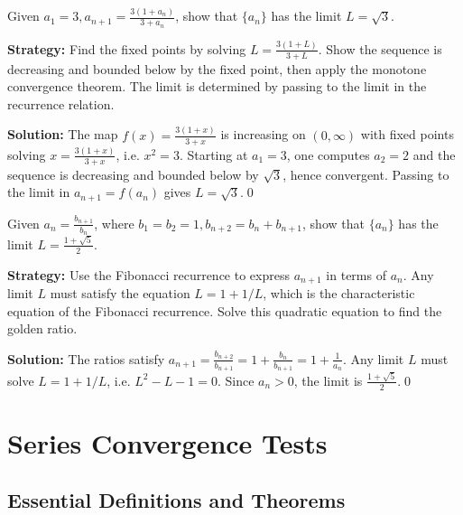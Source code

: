 \begin{problembox}
\begin{problemstatement}
Given \(a_1 = 3, a_{n+1} = \frac{3(1 + a_n)}{3 + a_n}\), show that \(\{a_n\}\) has the limit \(L = \sqrt{3}\).
\end{problemstatement}
\end{problembox}

\noindent\textbf{Strategy:} Find the fixed points by solving \(L=\frac{3(1+L)}{3+L}\). Show the sequence is decreasing and bounded below by the fixed point, then apply the monotone convergence theorem. The limit is determined by passing to the limit in the recurrence relation.

\bigskip\noindent\textbf{Solution:}
The map \(f(x)=\tfrac{3(1+x)}{3+x}\) is increasing on \((0,\infty)\) with fixed points solving \(x=\tfrac{3(1+x)}{3+x}\), i.e. \(x^2=3\). Starting at \(a_1=3\), one computes \(a_2=2\) and the sequence is decreasing and bounded below by \(\sqrt{3}\), hence convergent. Passing to the limit in \(a_{n+1}=f(a_n)\) gives \(L=\sqrt{3}\).\qed


\begin{problembox}
\begin{problemstatement}
Given \(a_n = \frac{b_{n+1}}{b_n}\), where \(b_1 = b_2 = 1, b_{n+2} = b_n + b_{n+1}\), show that \(\{a_n\}\) has the limit \(L = \frac{1 + \sqrt{5}}{2}\).
\end{problemstatement}
\end{problembox}

\noindent\textbf{Strategy:} Use the Fibonacci recurrence to express \(a_{n+1}\) in terms of \(a_n\). Any limit \(L\) must satisfy the equation \(L=1+1/L\), which is the characteristic equation of the Fibonacci recurrence. Solve this quadratic equation to find the golden ratio.

\bigskip\noindent\textbf{Solution:}
The ratios satisfy \(a_{n+1}=\tfrac{b_{n+2}}{b_{n+1}}=1+\tfrac{b_n}{b_{n+1}}=1+\tfrac{1}{a_n}\). Any limit \(L\) must solve \(L=1+1/L\), i.e. \(L^2-L-1=0\). Since \(a_n>0\), the limit is \(\tfrac{1+\sqrt{5}}{2}\).\qed
\section{Series Convergence Tests}

\subsection*{Essential Definitions and Theorems}


